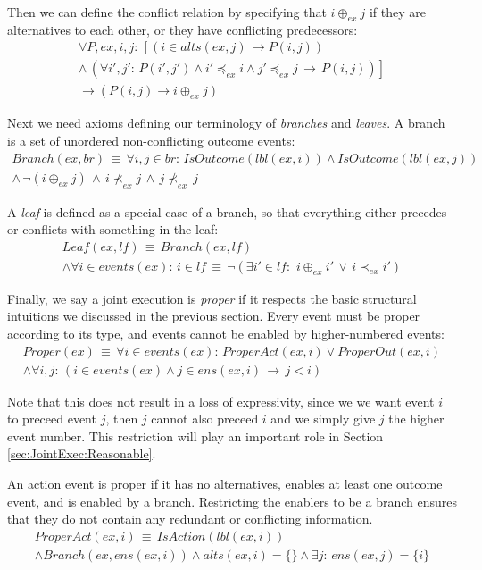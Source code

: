 Then we can define the conflict relation by specifying that $i\oplus_{ex}j$
if they are alternatives to each other, or they have conflicting predecessors:\begin{multline*}
\forall P,ex,i,j:\,\left[\left(i\in alts(ex,j)\,\rightarrow P(i,j)\right)\right.\\
\left.\wedge\,\left(\forall i',j':\, P(i',j')\wedge i'\preceq_{ex}i\wedge j'\preceq_{ex}j\,\rightarrow\, P(i,j)\right)\right]\\
\rightarrow\left(P(i,j)\rightarrow i\oplus_{ex}j\right)\end{multline*}


Next we need axioms defining our terminology of \emph{branches} and
\emph{leaves}. A branch is a set of unordered non-conflicting outcome
events:\begin{multline*}
Branch(ex,br)\,\equiv\,\forall i,j\in br:\, IsOutcome(lbl(ex,i))\wedge IsOutcome(lbl(ex,j))\\
\wedge\,\neg(i\oplus_{ex}j)\,\wedge\, i\not\prec_{ex}j\,\wedge\, j\not\prec_{ex}\, j\end{multline*}


A \emph{leaf} is defined as a special case of a branch, so that everything
either precedes or conflicts with something in the leaf:\begin{multline*}
Leaf(ex,lf)\,\equiv\, Branch(ex,lf)\\
\wedge\forall i\in events(ex):\, i\in lf\,\equiv\,\neg(\exists i'\in lf:\,\, i\oplus_{ex}i'\,\vee\, i\prec_{ex}i')\end{multline*}


Finally, we say a joint execution is \emph{proper} if it respects
the basic structural intuitions we discussed in the previous section.
Every event must be proper according to its type, and events cannot
be enabled by higher-numbered events:\begin{gather*}
Proper(ex)\,\equiv\,\forall i\in events(ex):\, ProperAct(ex,i)\vee ProperOut(ex,i)\\
\wedge\forall i,j:\,\left(i\in events(ex)\wedge j\in ens(ex,i)\,\rightarrow\, j<i\right)\end{gather*}


Note that this does not result in a loss of expressivity, since we
we want event $i$ to preceed event $j$, then $j$ cannot also preceed
$i$ and we simply give $j$ the higher event number. This restriction
will play an important role in Section \ref{sec:JointExec:Reasonable}.

An action event is proper if it has no alternatives, enables at least
one outcome event, and is enabled by a branch. Restricting the enablers
to be a branch ensures that they do not contain any redundant or conflicting
information.\begin{gather*}
ProperAct(ex,i)\,\equiv\, IsAction(lbl(ex,i))\\
\wedge Branch(ex,ens(ex,i))\wedge alts(ex,i)=\{\}\wedge\exists j:\, ens(ex,j)=\{i\}\end{gather*}


